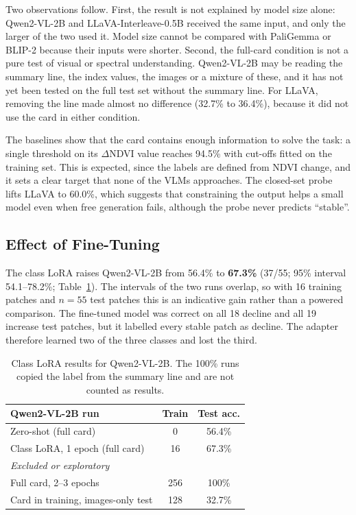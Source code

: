 Two observations follow. First, the result is not explained by model
size alone: Qwen2-VL-2B and LLaVA-Interleave-0.5B received the same
input, and only the larger of the two used it. Model size cannot be
compared with PaliGemma or BLIP-2 because their inputs were shorter.
Second, the full-card condition is not a pure test of visual or spectral
understanding. Qwen2-VL-2B may be reading the summary line, the index
values, the images or a mixture of these, and it has not yet been tested
on the full test set without the summary line. For LLaVA, removing the
line made almost no difference (32.7\% to 36.4\%), because it did not
use the card in either condition.

The baselines show that the card contains enough information to solve
the task: a single threshold on its $\Delta$NDVI value reaches 94.5\%
with cut-offs fitted on the training set. This is expected, since the
labels are defined from NDVI change, and it sets a clear target that
none of the VLMs approaches. The closed-set probe lifts LLaVA to 60.0\%,
which suggests that constraining the output helps a small model even
when free generation fails, although the probe never predicts
``stable''.

\subsection{Effect of Fine-Tuning}

The class LoRA raises Qwen2-VL-2B from 56.4\% to \textbf{67.3\%} (37/55;
95\% interval 54.1--78.2\%; Table~\ref{tab:lora}). The intervals of the
two runs overlap, so with 16 training patches and $n = 55$ test patches
this is an indicative gain rather than a powered comparison. The
fine-tuned model was correct on all 18 decline and all 19 increase test
patches, but it labelled every stable patch as decline. The adapter
therefore learned two of the three classes and lost the third.

\begin{table}[t]
\centering
\small
\begin{tabular}{@{}lcc@{}}
\toprule
Qwen2-VL-2B run & Train & Test acc. \\
\midrule
Zero-shot (full card) & 0 & 56.4\% \\
Class LoRA, 1 epoch (full card) & 16 & 67.3\% \\
\midrule
\multicolumn{3}{l}{\emph{Excluded or exploratory}} \\
Full card, 2--3 epochs & 256 & 100\% \\
Card in training, images-only test & 128 & 32.7\% \\
\bottomrule
\end{tabular}
\caption{Class LoRA results for Qwen2-VL-2B. The 100\% runs copied the
label from the summary line and are not counted as results.}
\label{tab:lora}
\end{table}

